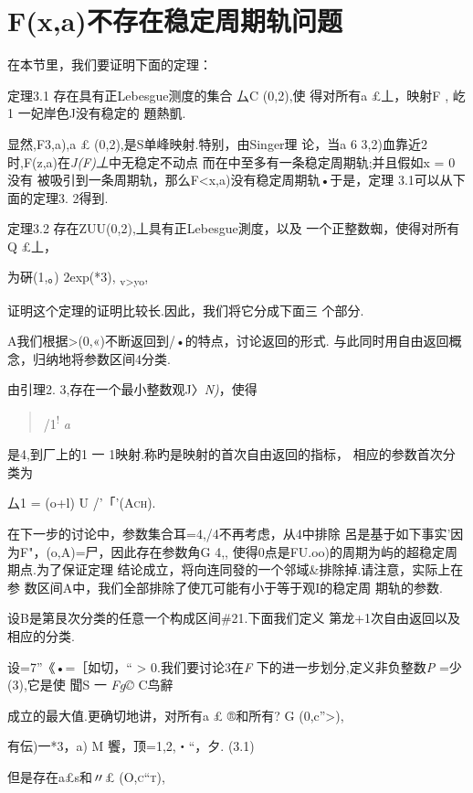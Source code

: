 \section{F(x,a)不存在稳定周期轨问题}

在本节里，我们要证明下面的定理：

定理3.1 存在具有正Lebesgue测度的集合 厶C (0,2),使 得对所有a £丄，映射F
, 屹1 一妃岸色J没有稳定的 題熱凱.

显然,F3,a),a £ (0,2),是S单峰映射.特别，由Singer理 论，当a 6
3,2)血靠近2时,F(z,a)在\emph{J(F)丄}中无稳定不动点
而在中至多有一条稳定周期轨;并且假如x = 0没有
被吸引到一条周期轨，那么F\textless{}x,a)没有稳定周期轨•于是，定理
3.1可以从下面的定理3. 2得到.

定理3.2 存在ZUU(0,2),丄具有正Lebesgue測度，以及
一个正整数蜘，使得对所有Q £丄，

\textbar{}为硏(1,。)\textbar{} 2exp(*3),
\textsubscript{v\textgreater{}yo},

证明这个定理的证明比较长.因此，我们将它分成下面三 个部分.

A我们根据\textgreater{}(0,«)不断返回到/•的特点，讨论返回的形式.
与此同时用自由返回概念，归纳地将参数区间4分类.

由引理2. 3,存在一个最小整数观J〉\emph{N)}，使得

\begin{quote}
/1\textsuperscript{!} \emph{a}
\end{quote}

是4,到厂上的1 一 1映射.称旳是映射的首次自由返回的指标，
相应的参数首次分类为

厶1 = (o+l) U /\textsc{'「'(Ach).}

在下一步的讨论中，参数集合耳=4,/4不再考虑，从4中排除
呂是基于如下事实'因为F"，(o,A)=尸，因此存在参数角G 4,,
使得0点是FU.oo)的周期为屿的超稳定周期点.为了保证定理
结论成立，将向连同發的一个邻域\&排除掉.请注意，实际上在参
数区间A中，我们全部排除了使兀可能有小于等于观I的稳定周 期轨的参数.

设B是第艮次分类的任意一个构成区间\#21.下面我们定义
第龙+1次自由返回以及相应的分类.

设=7''《•=［如切，\textbar{}``\textbar{} \textgreater{}
0.我们要讨论3在\emph{F} 下的进一步划分,定义非负整数\emph{P}
=少(3),它是使 聞S 一 \emph{Fg©} \textbar{} C鸟辭

成立的最大值.更确切地讲，对所有a £ ®和所有? G (0,c''\textgreater{}),

有伝)一*3，a)\textbar{} M 饗，顶=1,2,・``，夕. (3.1)

但是存在a£s和〃£ \textsc{(O,c``t),}

